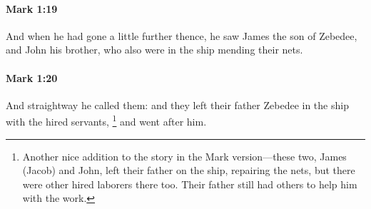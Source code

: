 		\paragraph{Mark 1:19} %
			\label{MARK-1-19}

			And when he had gone a little further thence, he saw James the son of Zebedee, and John his brother, who also were in the ship mending their nets.

			\begin{framed}
			\scriptsize
				\begin{compactdesc}
					\item[SBLG] 
				\end{compactdesc}
			\end{framed}

		\paragraph{Mark 1:20} %
			\label{MARK-1-20}

			And straightway he called them: and they left their father Zebedee in the ship with the hired servants,%
				\footnote{%
					Another nice addition to the story in the Mark version---these two, James (Jacob) and John, left their father on the ship, repairing the nets, but there were other hired laborers there too. Their father still had others to help him with the work.
					}
			and went after him.

